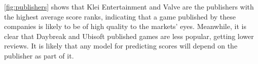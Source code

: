 \documentclass[dataset.tex]{subfiles}
\begin{document}
\autoref{fig:publishers} shows that Klei Entertainment and Valve are the
publishers with the highest average score ranks, indicating that a game
published by these companies is likely to be of high quality to the markets'
eyes. Meanwhile, it is clear that Daybreak and Ubisoft published games are less
popular, getting lower reviews. It is likely that any model for predicting
scores will depend on the publisher as part of it.
\end{document}
